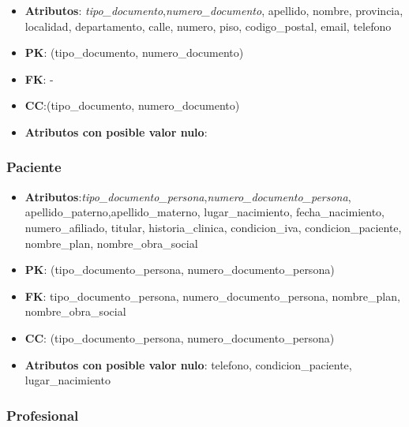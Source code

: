 \documentclass[a4paper,11pt]{article}
\begin{document}
\begin{itemize}

\item 
\textbf{Atributos}: \emph{tipo\_documento},\emph{numero\_documento}, apellido, nombre, provincia, localidad, departamento, calle, numero, piso, codigo\_postal, email, telefono

\item 
\textbf{PK}: (tipo\_documento, numero\_documento)

\item
\textbf{FK}: -

\item 
\textbf{CC}:(tipo\_documento, numero\_documento)

\item 
\textbf{Atributos con posible valor nulo}: 
\end{itemize}

\subsubsection{\textbf{Paciente}}

\begin{itemize}

\item 
\textbf{Atributos}:\emph{tipo\_documento\_persona},\emph{numero\_documento\_persona}, apellido\_paterno,apellido\_materno, lugar\_nacimiento, fecha\_nacimiento,  numero\_afiliado, titular, historia\_clinica, condicion\_iva, condicion\_paciente, nombre\_plan, nombre\_obra\_social

\item 
\textbf{PK}: (tipo\_documento\_persona, numero\_documento\_persona)

\item
\textbf{FK}:  tipo\_documento\_persona, numero\_documento\_persona, nombre\_plan, nombre\_obra\_social

\item 
\textbf{CC}: (tipo\_documento\_persona, numero\_documento\_persona)

\item 
\textbf{Atributos con posible valor nulo}: telefono, condicion\_paciente, lugar\_nacimiento

\end{itemize}
\subsubsection{\textbf{Profesional}}
\end{document}
